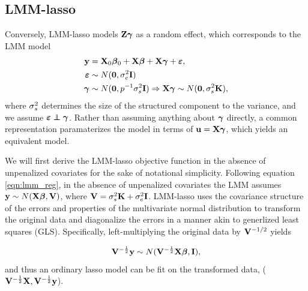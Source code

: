 \subsection{LMM-lasso}
\label{sec:lmmlasso}

Conversely, LMM-lasso models $\mathbf{Z}\boldsymbol{\gamma}$ as a random effect, which corresponds to the LMM model
\begin{equation}
  \begin{aligned}
    \label{eqn:lmm_reg}
    \mathbf{y} &= \mathbf{X}_0\boldsymbol{\beta}{}_0 + \mathbf{X}\boldsymbol{\beta}{} + \mathbf{X}\boldsymbol{\gamma}+ \boldsymbol{\varepsilon}{}, \\
    \boldsymbol{\varepsilon}{} &\sim N(\boldsymbol{0}, \sigma^2_e \mathbf{I}) \\
 \boldsymbol{\gamma} &\sim N(\boldsymbol{0}, p^{-1} \sigma^2_s \mathbf{I}) \Rightarrow \mathbf{X} \boldsymbol{\gamma} \sim N(\boldsymbol{0}, \sigma^2_s \mathbf{K}),
  \end{aligned}
\end{equation}
where $\sigma^2_s$ determines the size of the structured component to the variance, and we assume $\beps \independent \bgamma$. Rather than assuming anything about $\boldsymbol{\gamma}$ directly, a common representation paramaterizes the model in terms of $\mathbf{u}=\mathbf{X}\boldsymbol{\gamma}$, which yields an equivalent model. 

We will first derive the LMM-lasso objective function in the absence of unpenalized covariates for the sake of notational simplicity. Following equation \eqref{eqn:lmm_reg}, in the absence of unpenalized covariates the LMM assumes $\mathbf{y} \sim N(\mathbf{X} \boldsymbol{\beta}{}, \mathbf{V})$, where $\mathbf{V} = \sigma^2_s \textbf{K} + \sigma^2_e \textbf{I}$. LMM-lasso uses the covariance structure of the errors and properties of the multivariate normal distribution to transform the original data and diagonalize the errors in a manner akin to generlized least squares (GLS). Specifically, left-multiplying the original data by $\mathbf{V}^{-1/2}$ yields 

\begin{equation}
\label{eqn:rtY_distn}
\mathbf{V}^{-\frac{1}{2}}\mathbf{y} \sim N(\mathbf{V}^{-\frac{1}{2}} \mathbf{X} \boldsymbol{\beta}{}, \mathbf{I}),
\end{equation}
and thus an ordinary lasso model can be fit on the transformed data, ($\mathbf{V}^{-\frac{1}{2}}\mathbf{X}, \mathbf{V}^{-\frac{1}{2}}\mathbf{y}$). 

